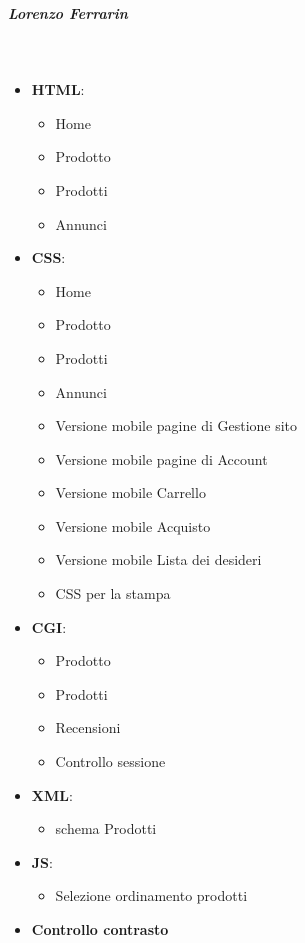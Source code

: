 	\subparagraph{Lorenzo Ferrarin}~
	
	\begin{itemize}
		\item \textbf{HTML}:
			\begin{itemize}
				\item Home
				\item Prodotto
				\item Prodotti
				\item Annunci
			\end{itemize}
		
		\item \textbf{CSS}:
			\begin{itemize}
				\item Home
				\item Prodotto
				\item Prodotti
				\item Annunci
				\item Versione mobile pagine di Gestione sito
				\item Versione mobile pagine di Account
				\item Versione mobile Carrello
				\item Versione mobile Acquisto
				\item Versione mobile Lista dei desideri
				\item CSS per la stampa
			\end{itemize}
		\item \textbf{CGI}:
			\begin{itemize}
				\item Prodotto
				\item Prodotti
				\item Recensioni
				\item Controllo sessione
			\end{itemize}
		
		\item \textbf{XML}:
			\begin{itemize}
			 	\item schema Prodotti
			\end{itemize}
		\item \textbf{JS}:
			\begin{itemize}
				\item Selezione ordinamento prodotti
			\end{itemize}
		\item \textbf{Controllo contrasto}
	\end{itemize}
	
